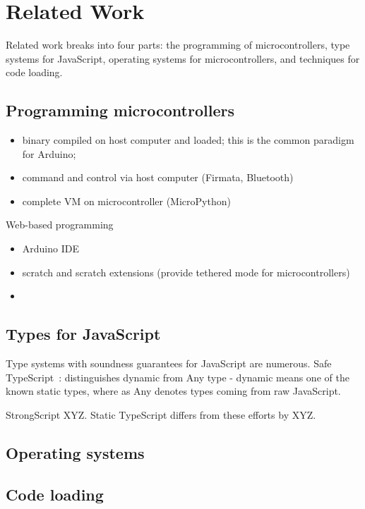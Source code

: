 \section{Related Work}
\label{sec:related}

Related work breaks into four parts: the programming of microcontrollers, 
type systems for JavaScript, operating systems
for microcontrollers, and techniques for code loading.

\subsection{Programming microcontrollers}

\begin{itemize}
\item binary compiled on host computer and loaded; this is the common paradigm for Arduino;
\item command and control via host computer (Firmata, Bluetooth)
\item complete VM on microcontroller (MicroPython)
\end{itemize}

Web-based programming

\begin{itemize}
\item Arduino IDE
\item scratch and scratch extensions (provide tethered mode for microcontrollers)
\item 
\end{itemize}

\subsection{Types for JavaScript}

Type systems with soundness guarantees for JavaScript are numerous. 
Safe TypeScript~\cite{SafeTypeScript15}: distinguishes dynamic from Any type - dynamic means
one of the known static types, where as Any denotes types coming
from raw JavaScript.

StrongScript XYZ.
Static TypeScript differs from these efforts by XYZ. 


\subsection{Operating systems}



\subsection{Code loading}

